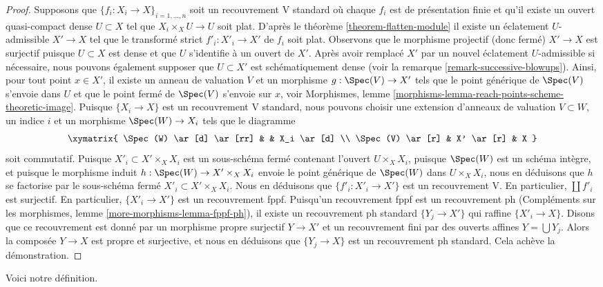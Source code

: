 \begin{proof}
\medskip\noindent
Supposons que $\{f_i : X_i \to X\}_{i = 1, \ldots, n}$ soit un recouvrement V standard
où chaque $f_i$ est de présentation finie et qu'il existe un ouvert quasi-compact dense
$U \subset X$ tel que $X_i \times_X U \to U$ soit plat.
D'après le théorème \ref{theorem-flatten-module}
il existe un éclatement $U$-admissible $X' \to X$ tel que
le transformé strict $f'_i : X'_i \to X'$ de $f_i$ soit plat.
Observons que le morphisme projectif (donc fermé) $X' \to X$
est surjectif puisque $U \subset X$ est dense et que $U$ s'identifie
à un ouvert de $X'$. Après avoir remplacé $X'$ par un nouvel
éclatement $U$-admissible si nécessaire,
nous pouvons également supposer que $U \subset X'$ est schématiquement dense
(voir la remarque \ref{remark-successive-blowups}).
Ainsi, pour tout point $x \in X'$, il existe un anneau de valuation $V$
et un morphisme $g : \Spec(V) \to X'$ tels que le point générique
de $\Spec(V)$ s'envoie dans $U$ et que le point fermé de
$\Spec(V)$ s'envoie sur $x$, voir Morphismes, lemme
\ref{morphisms-lemma-reach-points-scheme-theoretic-image}.
Puisque $\{X_i \to X\}$ est un recouvrement V standard, nous pouvons choisir
une extension d'anneaux de valuation $V \subset W$, un indice $i$ et un morphisme
$\Spec(W) \to X_i$ tels que le diagramme
$$
\xymatrix{
\Spec(W) \ar[d] \ar[rr] & & X_i \ar[d] \\
\Spec(V) \ar[r] & X' \ar[r] & X
}
$$
soit commutatif. Puisque $X'_i \subset X' \times_X X_i$ est un sous-schéma fermé
contenant l'ouvert $U \times_X X_i$, puisque $\Spec(W)$ est un schéma intègre,
et puisque le morphisme induit $h : \Spec(W) \to X' \times_X X_i$ envoie
le point générique de $\Spec(W)$ dans $U \times_X X_i$, nous en déduisons
que $h$ se factorise par le sous-schéma fermé $X'_i \subset X' \times_X X_i$.
Nous en déduisons que $\{f'_i : X'_i \to X'\}$ est un recouvrement V.
En particulier, $\coprod f'_i$ est surjectif. En particulier,
$\{X'_i \to X'\}$ est un recouvrement fppf. Puisqu'un recouvrement fppf est un recouvrement ph
(Compléments sur les morphismes, lemme \ref{more-morphisms-lemma-fppf-ph}),
il existe un recouvrement ph standard $\{Y_j \to X'\}$ qui raffine
$\{X'_i \to X\}$. Disons que ce recouvrement est donné par un morphisme propre surjectif
$Y \to X'$ et un recouvrement fini par des ouverts affines
$Y = \bigcup Y_j$. Alors la composée $Y \to X$ est propre et surjective,
et nous en déduisons que $\{Y_j \to X\}$ est un recouvrement ph standard.
Cela achève la démonstration.
\end{proof}

\noindent
Voici notre définition.

